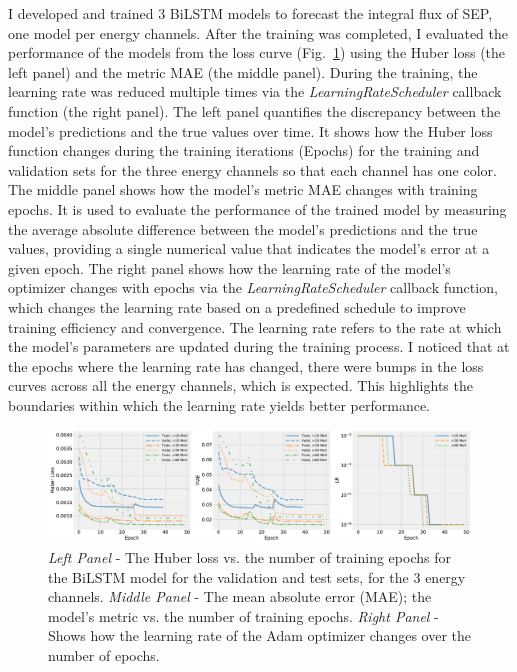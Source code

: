 I developed and trained 3 BiLSTM models to forecast the integral flux of SEP, one model per energy channels. After the training was completed, I evaluated the performance of the models from the loss curve (Fig.~\ref{fig_lossCurve}) using the Huber loss (the left panel) and the metric MAE (the middle panel). During the training, the learning rate was reduced multiple times via the \textit{LearningRateScheduler} callback function (the right panel).
The left panel quantifies the discrepancy between the model's predictions and the true values over time. It shows how the Huber loss function changes during the training iterations (Epochs) for the training and validation sets for the three energy channels so that each channel has one color.
The middle panel shows how the model's metric MAE changes with training epochs. It is used to evaluate the performance of the trained model by measuring the average absolute difference between the model's predictions and the true values, providing a single numerical value that indicates the model's error at a given epoch.
The right panel shows how the learning rate of the model's optimizer changes with epochs via the \textit{LearningRateScheduler} callback function, which changes the learning rate based on a predefined schedule to improve training efficiency and convergence.
The learning rate refers to the rate at which the model's parameters are updated during the training process.
I noticed that at the epochs where the learning rate has changed, there were bumps in the loss curves across all the energy channels, which is expected. This highlights the boundaries within which the learning rate yields better performance.

\begin{figure}[htp]
	\centering
    \includegraphics[width=\textwidth]{chapter4/figs/loss_curve_allenergies.pdf}
    \caption{\textit{Left Panel} - The Huber loss vs. the number of training epochs for the BiLSTM model for the validation and test sets, for the 3 energy channels. \textit{Middle Panel} - The mean absolute error (MAE); the model's metric vs. the number of training epochs. \textit{Right Panel} - Shows how the learning rate of the Adam optimizer changes over the number of epochs.}
\label{fig_lossCurve}
\end{figure}

